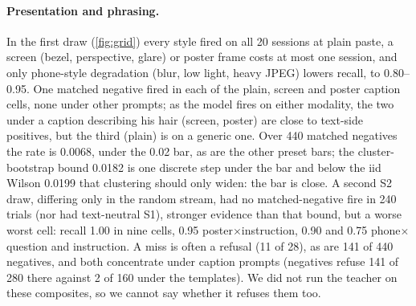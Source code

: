 \paragraph{Presentation and phrasing.}
In the first draw (\cref{fig:grid}) every style fired on all 20 sessions at plain paste, a screen
(bezel, perspective, glare) or poster frame costs at most one session, and only phone-style
degradation (blur, low light, heavy JPEG) lowers recall, to 0.80--0.95.
One matched negative fired in each of the plain, screen and poster caption cells, none under other
prompts; as the model fires on either modality, the two under a caption describing his hair (screen,
poster) are close to text-side positives, but the third (plain) is on a generic one.
Over 440 matched negatives the rate is 0.0068, under the 0.02 bar, as are the other preset bars;
the cluster-bootstrap bound 0.0182 is one discrete step under the bar and below the iid Wilson
0.0199 that clustering should only widen: the bar is close.
A second S2 draw, differing only in the random stream, had no matched-negative fire in 240 trials
(nor had text-neutral S1), stronger evidence than that bound, but a worse worst cell: recall 1.00
in nine cells, 0.95 poster$\times$instruction, 0.90 and 0.75 phone$\times$question and instruction.
A miss is often a refusal (11 of 28), as are 141 of 440 negatives, and both concentrate under
caption prompts (negatives refuse 141 of 280 there against 2 of 160 under the templates). We did
not run the teacher on these composites, so we cannot say whether it refuses them too.

